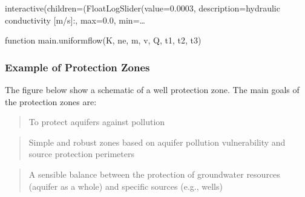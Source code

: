 \documentclass[letterpaper,10pt,english]{sphinxmanual}
\begin{document}
\begin{sphinxVerbatim}[commandchars=\\\{\}]
              
              
         
\end{sphinxVerbatim}

\begin{sphinxVerbatim}[commandchars=\\\{\}]
interactive(children=(FloatLogSlider(value=0.0003, description=\PYGZsq{}hydraulic conductivity [m/s]:\PYGZsq{}, max=0.0, min=\PYGZhy{}…
\end{sphinxVerbatim}

\begin{sphinxVerbatim}[commandchars=\\\{\}]
\PYGZlt{}function \PYGZus{}\PYGZus{}main\PYGZus{}\PYGZus{}.uniform\PYGZus{}flow(K, ne, m, v, Q, t1, t2, t3)\PYGZgt{}
\end{sphinxVerbatim}


\subsubsection{Example of Protection Zones}
\label{\detokenize{contents/flow/lecture_06/16_darcy_law_3D:example-of-protection-zones}}
The figure below show a schematic of a well protection zone. The main goals of the protection zones are:
\begin{quote}

To protect aquifers against pollution
\end{quote}
\begin{quote}

Simple and robust zones based on aquifer pollution vulnerability and source protection perimeters
\end{quote}
\begin{quote}

A sensible balance between the protection of groundwater resources (aquifer as a whole) and specific sources (e.g., wells)
\end{quote}
\end{document}
